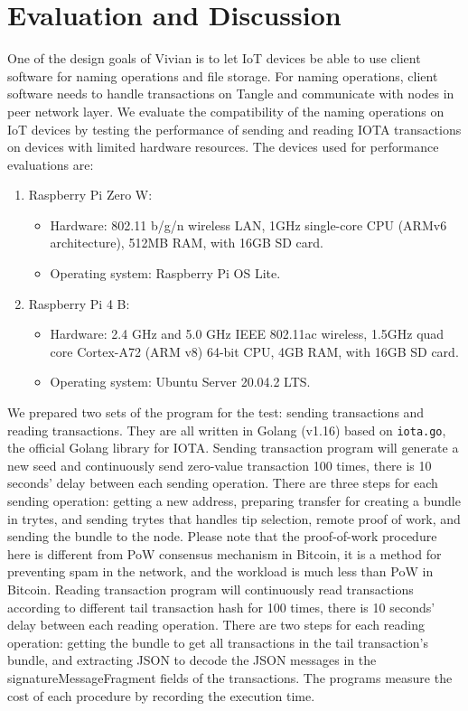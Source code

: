\section{Evaluation and Discussion}
\label{sec:discussion}

One of the design goals of Vivian is to let IoT devices be able to use client software for naming operations and file storage.
For naming operations, client software needs to handle transactions on Tangle and communicate with nodes in peer network layer.
We evaluate the compatibility of the naming operations on IoT devices by testing the performance of sending and reading IOTA transactions on devices with limited hardware resources.
The devices used for performance evaluations are:

\begin{enumerate}
    \item Raspberry Pi Zero W: 
        \begin{itemize}
            \item Hardware: 802.11 b/g/n wireless LAN, 1GHz single-core CPU (ARMv6 architecture), 512MB RAM, with 16GB SD card.
            \item Operating system: Raspberry Pi OS Lite.
        \end{itemize}
    \item Raspberry Pi 4 B: 
    \begin{itemize}
        \item Hardware: 2.4 GHz and 5.0 GHz IEEE 802.11ac wireless,  1.5GHz quad core Cortex-A72 (ARM v8) 64-bit CPU, 4GB RAM, with 16GB SD card.
        \item Operating system: Ubuntu Server 20.04.2 LTS.
    \end{itemize}
\end{enumerate}

We prepared two sets of the program for the test: sending transactions and reading transactions. They are all written in Golang (v1.16) based on \texttt{iota.go}, the official Golang library for IOTA.
Sending transaction program will generate a new seed and continuously send zero-value transaction 100 times, there is 10 seconds' delay between each sending operation.
There are three steps for each sending operation: getting a new address, preparing transfer for creating a bundle in trytes, and sending trytes that handles tip selection, remote proof of work, and sending the bundle to the node.
Please note that the proof-of-work procedure here is different from PoW consensus mechanism in Bitcoin, it is a method for preventing spam in the network, and the workload is much less than PoW in Bitcoin.
Reading transaction program will continuously read transactions according to different tail transaction hash for 100  times, there is 10 seconds' delay between each reading operation.
There are two steps for each reading operation: getting the bundle to get all transactions in the tail transaction's bundle, and extracting JSON to decode the JSON messages in the signatureMessageFragment fields of the transactions.
The programs measure the cost of each procedure by recording the execution time.

